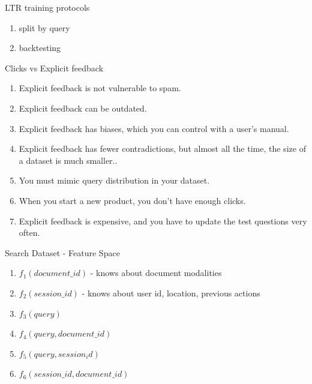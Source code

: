 \documentclass[10pt]{beamer}
\begin{document}
\begin{frame}{LTR training protocols}
\begin{enumerate}
    \item split by query
    \item backtesting
\end{enumerate}
\end{frame}


\begin{frame}{Clicks vs Explicit feedback}
\begin{enumerate}
    \item Explicit feedback is not vulnerable to spam.
    \item Explicit feedback can be outdated.
    \item Explicit feedback has biases, which you can control with a user's manual.
    \item Explicit feedback has fewer contradictions, but almost all the time, the size of a dataset is much smaller..
    \item You must mimic query distribution in your dataset.
    \item When you start a new product, you don't have enough clicks.
    \item Explicit feedback is expensive, and you have to update the test questions very often.
\end{enumerate}
\end{frame}


\begin{frame}{Search Dataset - Feature Space}
    \begin{enumerate}
        \item $f_1(document\_id)$ - knows about document modalities
        \item $f_2(session\_id)$ - knows about user id, location, previous actions
        \item $f_3(query)$
        \item $f_4(query, document\_id)$
        \item $f_5(query, session_id)$
        \item $f_6(session\_id, document\_id)$
    \end{enumerate}
\end{frame}
\end{document}

